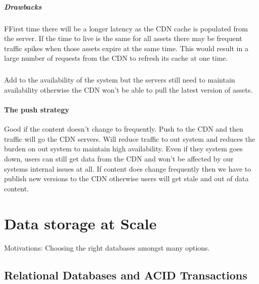 \documentclass[a4paper, 11pt]{book}
\begin{document}
    \paragraph{Drawbacks}
    FFirst time there will be a longer latency as the CDN cache is populated from the server.
    If the time to live is the same for all assets there may be frequent traffic spikes when those assets expire at the same time.
    This would result in a large number of requests from the CDN to refresh its cache at one time.

    \paragraph{}
    Add to the availability of the system but the servers still need to maintain availability otherwise the CDN won't be able to pull the latest version of assets.

    \subsubsection{The push strategy}
    Good if the content doesn't change to frequently.
    Push to the CDN and then traffic will go the CDN servers.
    Will reduce traffic to out system and reduces the burden on out system to maintain high availability.
    Even if they system goes down, users can still get data from the CDN and won't be affected by our systems internal issues at all.
    If content does change frequently then we have to publish new versions to the CDN otherwise users will get stale and out of data content.


    \chapter{Data storage at Scale}
    Motivations: Choosing the right databases amongst many options.


    \section{Relational Databases and ACID Transactions}
\end{document}
